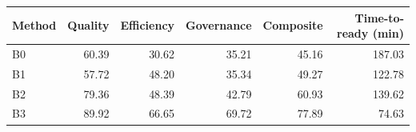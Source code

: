 \begin{tabular}{lrrrrr}
\hline
Method & Quality & Efficiency & Governance & Composite & Time-to-ready (min) \\
\hline
B0 & 60.39 & 30.62 & 35.21 & 45.16 & 187.03 \\
B1 & 57.72 & 48.20 & 35.34 & 49.27 & 122.78 \\
B2 & 79.36 & 48.39 & 42.79 & 60.93 & 139.62 \\
B3 & 89.92 & 66.65 & 69.72 & 77.89 & 74.63 \\
\hline
\end{tabular}
